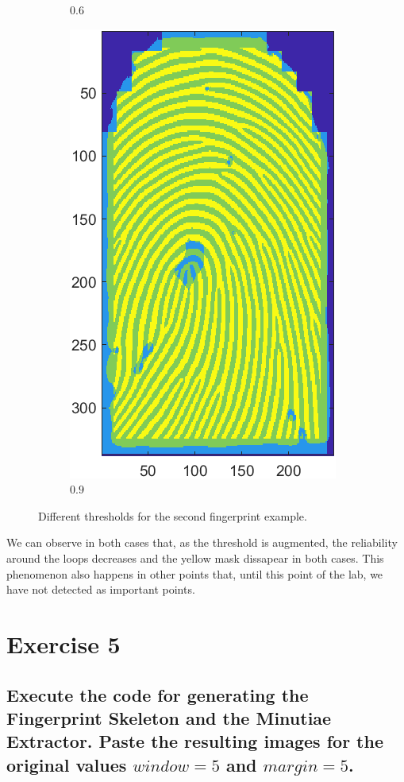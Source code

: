 \documentclass[a4paper]{article}
\begin{document}
\begin{figure}[h!]
\begin{subfigure}[t]{0.2\textwidth}
      \caption{\(0.6\)}
  \end{subfigure}%
  \quad
  \begin{subfigure}[t]{0.2\textwidth}
      \centering
      \includegraphics[scale=0.5]{Figures/E4-e2-0.9}
      \caption{\(0.9\)}
  \end{subfigure}
    \caption{Different thresholds for the second fingerprint example.}
    \label{fig:ex4-2nd}
\end{figure}

We can observe in both cases that, as the threshold is augmented, the reliability around the loops decreases and the yellow mask dissapear in both cases. This phenomenon also happens in other points that, until this point of the lab, we have not detected as important points.




\section{Exercise 5}
\subsection{ Execute the code for generating the Fingerprint Skeleton and the Minutiae Extractor. Paste the resulting images for the original values \(window=5\) and \(margin=5\). }
\end{document}

